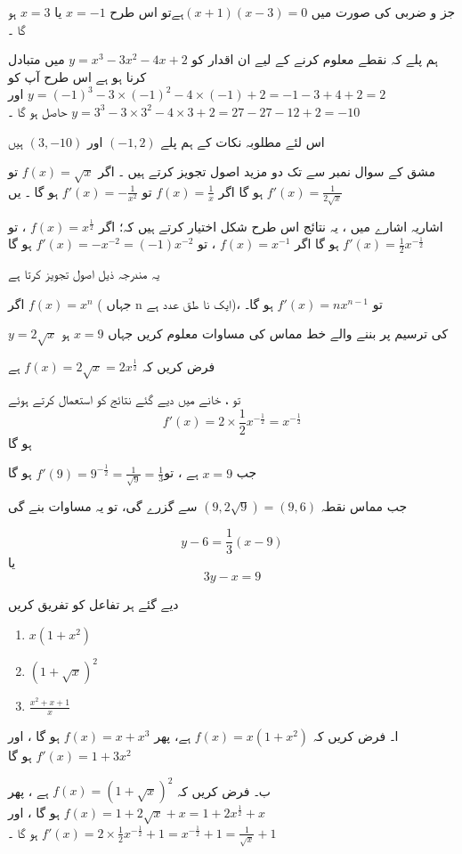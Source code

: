 جز و ضربی کی صورت میں 
\((x+1)(x-3)=0\)ہےتو اس طرح \(x=-1\) یا \(x=3\) ہو گا ۔

ہم پلے کہ نقطے معلوم کرنے کے لیے ان اقدار کو \(y=x^3 -3x^2 -4x +2\) میں متبادل کرنا ہو ہے 
اس طرح آپ کو \(y=(-1)^{3} -3 \times (-1)^{2} -4 \times (-1) +2=-1-3+4+2=2 \) اور \(y=3^3 -3 \times 3^2 -4 \times 3+2 =27 -27 -12 +2 =-10\) حاصل ہو گا ۔ 

اس لئے مطلوبہ نکات کے ہم پلے \((-1,2)\) اور \((3,-10)\) ہیں 

مشق  کے سوال نمبر سے  تک دو مزید اصول تجویز کرتے ہیں ۔
اگر \(f(x) = \sqrt{x}\) تو \(f'(x) = \frac{1}{2 \sqrt{x}}\) ہو گا 
اگر \(f(x) = \frac{1}{x}\) تو \(f'(x) = - \frac{1}{x^2}\) ہو گا ۔ 
یں

اشاریہ اشارے میں ، یہ نتائج اس طرح شکل اختیار کرتے ہیں  کہ؛
اگر \(f(x) =x^{\frac{1}{2}}\) ، تو \(f'(x)= \frac{1}{2} x^{- \frac{1}{2}}\) ہو گا
اگر \(f(x)=x^{-1}\) ، تو \(f'(x)=-x^{-2} = (-1)x^{-2}\) ہو گا

یہ مندرجہ ذیل اصول تجویز کرتا ہے 

اگر \(f(x)=x^n\) ( جہاں n  ایک نا طق عدد ہے)، تو  \( f'(x) =nx^{n-1}\) ہو گا۔ 


 \(y=2\sqrt{x}\)  کی ترسیم پر بننے والے خط مماس کی مساوات معلوم کریں جہاں \(x=9\) ہو

فرض کریں کہ \(f(x)=2\sqrt{x}=2x^{\frac{1}{2}}\) ہے 

تو ، خانے میں دیے گئے نتائج کو استعمال کرتے ہوئے   \[f'(x) = 2 \times \frac{1}{2} x^{-\frac{1}{2}}= x^{-\frac{1}{2}}\] ہو گا

 جب \(x=9\) ہے ، تو\(  f'(9) =9^{-\frac{1}{2}}=\frac{1}{\sqrt{9}} = \frac{1}{3}\) ہو گا

جب مماس نقطہ \((9,2\sqrt{9})=(9,6)\) سے گزرے گی، تو یہ مساوات  بنے گی 

\[y-6=\frac{1}{3}(x-9)\]  یا  \[3y-x=9\]



دیے گئے ہر تفاعل کو تفریق کریں 
\begin{enumerate}[.a]
\item \(x(1+x^2)\)
\item \((1+\sqrt{x})^2\)
\item \(\frac{x^2+x+1}{x}\)
\end{enumerate}

ا۔   فرض کریں کہ   \(f(x)=x(1+x^2)\) ہے،
پھر \(f(x)=x+x^3\) ہو گا ، اور \(f'(x)= 1+3x^2\) ہو گا

ب۔ فرض کریں کہ  \(f(x)=(1+\sqrt{x})^2\) ہے ،
پھر \(f(x)=1+2\sqrt{x} +x=1+2x^{\frac{1}{2}} +x \) ہو گا ، اور \(f'(x)=2 \times \frac{1}{2} x^{-\frac{1}{2}}+1=x^{-\frac{1}{2}}+1=\frac{1}{\sqrt{x}}+1\) ہو گا ۔
 
